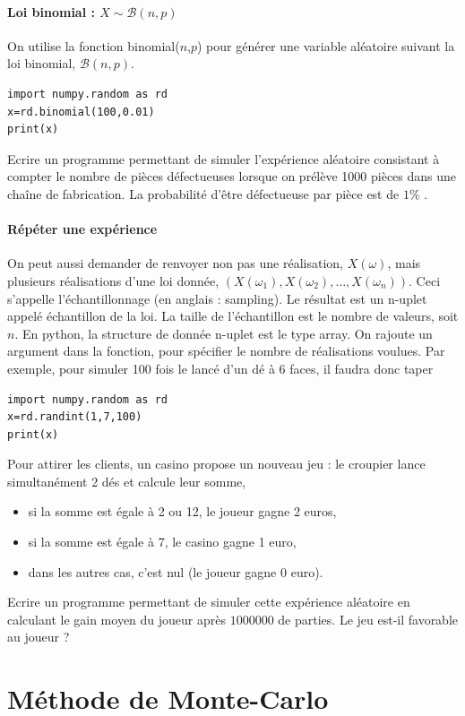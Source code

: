 \documentclass{article}
\theoremstyle{remark}
\begin{document}
\paragraph{Loi binomial : $X\sim\mathcal{B}(n, p)$}
On utilise la fonction binomial($n$,$p$) pour générer une variable aléatoire suivant la loi binomial, $\mathcal{B}(n, p)$.
\begin{lstlisting}
import numpy.random as rd
x=rd.binomial(100,0.01)
print(x)
\end{lstlisting}
Ecrire un programme permettant de simuler l'expérience aléatoire consistant à compter le nombre de pièces défectueuses  lorsque on prélève 1000 pièces dans une chaîne de fabrication. La probabilité d'être défectueuse par pièce est de $1\%$ .    


\paragraph{Répéter une expérience}
On peut aussi demander de renvoyer non pas une réalisation, $X(\omega)$, mais plusieurs réalisations d'une
loi donnée, $(X(\omega_1),X(\omega_2),\dots,X(\omega_n))$. Ceci s'appelle l'échantillonnage (en anglais :
sampling). Le résultat est un n-uplet appelé échantillon de la loi. La taille de l'échantillon est le nombre de valeurs, soit $n$. En python, la structure de donnée n-uplet est le type
array. On rajoute un argument dans la fonction, pour
spécifier le nombre de réalisations voulues. Par exemple, pour simuler 100 fois le lancé d'un dé à 6 faces, il faudra donc taper
\begin{lstlisting}
import numpy.random as rd
x=rd.randint(1,7,100)
print(x)
\end{lstlisting}
Pour attirer les clients, un casino propose un nouveau jeu : le croupier lance simultanément 2 dés et calcule leur somme,
\begin{itemize} 
\item si la somme est égale à 2 ou 12, le joueur gagne 2 euros,
\item si la somme est égale à 7, le casino gagne 1 euro,
\item dans les autres cas, c'est nul (le joueur gagne 0 euro).  
\end{itemize}
Ecrire un programme permettant de simuler cette expérience aléatoire en calculant le gain moyen du joueur après $1 000 000$ de parties. Le jeu est-il favorable au joueur ?

\section*{Méthode de Monte-Carlo}
\end{document}
